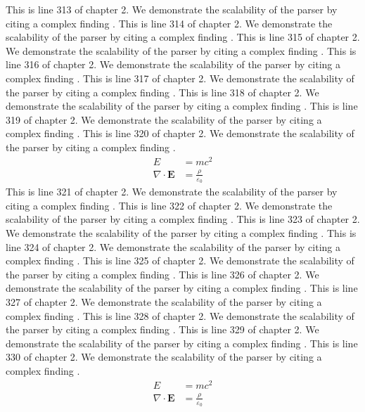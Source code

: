 This is line 313 of chapter 2. We demonstrate the scalability of the parser by citing a complex finding \cite{ref2_313}.
This is line 314 of chapter 2. We demonstrate the scalability of the parser by citing a complex finding \cite{ref2_314}.
This is line 315 of chapter 2. We demonstrate the scalability of the parser by citing a complex finding \cite{ref2_315}.
This is line 316 of chapter 2. We demonstrate the scalability of the parser by citing a complex finding \cite{ref2_316}.
This is line 317 of chapter 2. We demonstrate the scalability of the parser by citing a complex finding \cite{ref2_317}.
This is line 318 of chapter 2. We demonstrate the scalability of the parser by citing a complex finding \cite{ref2_318}.
This is line 319 of chapter 2. We demonstrate the scalability of the parser by citing a complex finding \cite{ref2_319}.
This is line 320 of chapter 2. We demonstrate the scalability of the parser by citing a complex finding \cite{ref2_320}.
\begin{align*}
  E &= mc^2 \\
  \nabla \cdot \mathbf{E} &= \frac{\rho}{\varepsilon_0}
\end{align*}
This is line 321 of chapter 2. We demonstrate the scalability of the parser by citing a complex finding \cite{ref2_321}.
This is line 322 of chapter 2. We demonstrate the scalability of the parser by citing a complex finding \cite{ref2_322}.
This is line 323 of chapter 2. We demonstrate the scalability of the parser by citing a complex finding \cite{ref2_323}.
This is line 324 of chapter 2. We demonstrate the scalability of the parser by citing a complex finding \cite{ref2_324}.
This is line 325 of chapter 2. We demonstrate the scalability of the parser by citing a complex finding \cite{ref2_325}.
This is line 326 of chapter 2. We demonstrate the scalability of the parser by citing a complex finding \cite{ref2_326}.
This is line 327 of chapter 2. We demonstrate the scalability of the parser by citing a complex finding \cite{ref2_327}.
This is line 328 of chapter 2. We demonstrate the scalability of the parser by citing a complex finding \cite{ref2_328}.
This is line 329 of chapter 2. We demonstrate the scalability of the parser by citing a complex finding \cite{ref2_329}.
This is line 330 of chapter 2. We demonstrate the scalability of the parser by citing a complex finding \cite{ref2_330}.
\begin{align*}
  E &= mc^2 \\
  \nabla \cdot \mathbf{E} &= \frac{\rho}{\varepsilon_0}
\end{align*}
